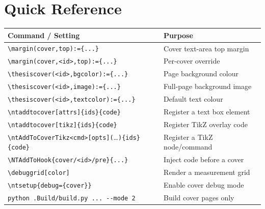 \section{Quick Reference}
\label{sec:covers_quickref}

\begin{center}
\renewcommand{\arraystretch}{1.3}
\begin{tabular}{lp{8cm}}
  \hline
  \textbf{Command / Setting} & \textbf{Purpose} \\
  \hline
  \verb!\margin(cover,top):={...}!          & Cover text-area top margin \\
  \verb!\margin(cover,<id>,top):={...}!     & Per-cover override \\
  \verb!\thesiscover(<id>,bgcolor):={...}!  & Page background colour \\
  \verb!\thesiscover(<id>,image):={...}!    & Full-page background image \\
  \verb!\thesiscover(<id>,textcolor):={...}!& Default text colour \\
  \verb!\ntaddtocover[attrs]{ids}{code}!    & Register a text box element \\
  \verb!\ntaddtocover[tikz]{ids}{code}!     & Register TikZ overlay code \\
  \verb!\ntAddToCoverTikz<cmd>[opts](!…\verb!){ids}{code}! & Register a TikZ node/command \\
  \verb!\NTAddToHook{cover/<id>/pre}{...}!  & Inject code before a cover \\
  \verb!\debuggrid[color]!                  & Render a measurement grid \\
  \verb!\ntsetup{debug={cover}}!            & Enable cover debug mode \\
  \verb!python .Build/build.py ... --mode 2! & Build cover pages only \\
  \hline
\end{tabular}
\end{center}
